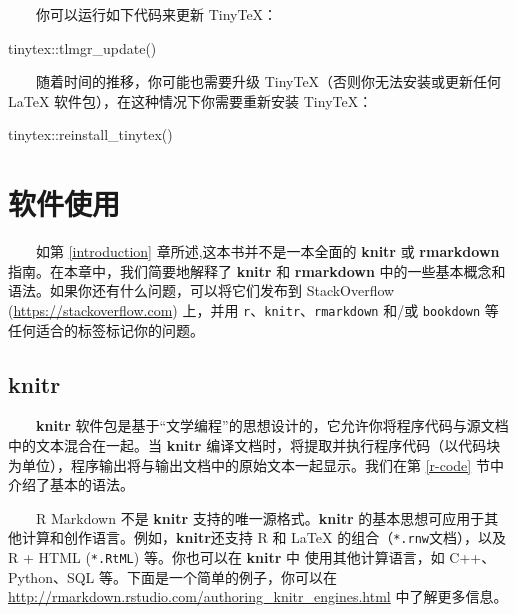 \documentclass[
  12pt,
]{krantz}
\newenvironment{Shaded}{\begin{snugshade}}{\end{snugshade}}
\newcommand{\FunctionTok}[1]{\textcolor[rgb]{0.00,0.00,0.00}{#1}}
\newcommand{\NormalTok}[1]{#1}
\newcommand{\SpecialCharTok}[1]{\textcolor[rgb]{0.00,0.00,0.00}{#1}}
\theoremstyle{definition}
\theoremstyle{definition}
\theoremstyle{definition}
\theoremstyle{definition}
\theoremstyle{remark}
\begin{document}
  你可以运行如下代码来更新 TinyTeX：

\begin{Shaded}
\begin{Highlighting}[]
\NormalTok{tinytex}\SpecialCharTok{::}\FunctionTok{tlmgr\_update}\NormalTok{()}
\end{Highlighting}
\end{Shaded}

  随着时间的推移，你可能也需要升级 TinyTeX（否则你无法安装或更新任何 LaTeX 软件包），在这种情况下你需要重新安装 TinyTeX：

\begin{Shaded}
\begin{Highlighting}[]
\NormalTok{tinytex}\SpecialCharTok{::}\FunctionTok{reinstall\_tinytex}\NormalTok{()}
\end{Highlighting}
\end{Shaded}

\hypertarget{software-usage}{%
\chapter{软件使用}\label{software-usage}}

  如第 \ref{introduction} 章所述,这本书并不是一本全面的 \textbf{knitr} 或 \textbf{rmarkdown} 指南。在本章中，我们简要地解释了 \textbf{knitr} 和 \textbf{rmarkdown} 中的一些基本概念和语法。如果你还有什么问题，可以将它们发布到 StackOverflow (\url{https://stackoverflow.com}) 上，并用 \texttt{r}、\texttt{knitr}、\texttt{rmarkdown} 和/或 \texttt{bookdown} 等任何适合的标签标记你的问题。

\hypertarget{knitr}{%
\section{knitr}\label{knitr}}

  \textbf{knitr} 软件包是基于``文学编程''\citep{knuth1984}的思想设计的，它允许你将程序代码与源文档中的文本混合在一起。当 \textbf{knitr} 编译文档时，将提取并执行程序代码（以代码块为单位），程序输出将与输出文档中的原始文本一起显示。我们在第 \ref{r-code} 节中介绍了基本的语法。

  R Markdown 不是 \textbf{knitr} 支持的唯一源格式。\textbf{knitr} 的基本思想可应用于其他计算和创作语言。例如，\textbf{knitr}还支持 R 和 LaTeX 的组合（\texttt{*.rnw}文档），以及 R + HTML (\texttt{*.RtML}) 等。你也可以在 \textbf{knitr} 中 使用其他计算语言，如 C++、Python、SQL 等。下面是一个简单的例子，你可以在 \url{http://rmarkdown.rstudio.com/authoring_knitr_engines.html} 中了解更多信息。
\end{document}
